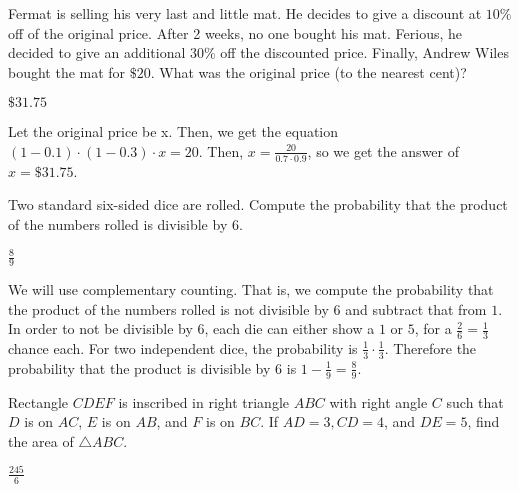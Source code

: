\documentclass[11pt]{article}
\begin{document}
\begin{problem} %
Fermat is selling his very last and little mat. He decides to give a discount at $10\%$ off of the original price. After 2 weeks, no one bought his mat. Ferious, he decided to give an additional $30\%$ off the discounted price. Finally, Andrew Wiles bought the mat for $\$20$. What was the original price (to the nearest cent)?
\end{problem}

\begin{answer}
$\$31.75$
\end{answer}

\begin{solution}
Let the original price be x. Then, we get the equation $(1-0.1) \cdot (1-0.3) \cdot x = 20$. Then, $x = \frac{20}{0.7 \cdot 0.9}$, so we get the answer of $x = \$31.75$.
\end{solution}


\begin{problem}
Two standard six-sided dice are rolled. Compute the probability that the product of the numbers rolled is divisible by $6$.
\end{problem}

\begin{answer} %
$\boxed{\frac{8}{9}}$
\end{answer}

\begin{solution}
We will use complementary counting. That is, we compute the probability that the product of the numbers rolled is not divisible by $6$ and subtract that from $1$. In order to not be divisible by $6$, each die can either show a $1$ or $5$, for a $\frac{2}{6} = \frac{1}{3}$ chance each. For two independent dice, the probability is $\frac{1}{3} \cdot \frac{1}{3}$. Therefore the probability that the product is divisible by $6$ is $1 - \frac{1}{9} = \boxed{\frac{8}{9}}$.
\end{solution}


\begin{problem}%
Rectangle $CDEF$ is inscribed in right triangle $ABC$ with right angle $C$ such that $D$ is on $AC$, $E$ is on $AB$, and $F$ is on $BC$. If $AD=3, CD=4$, and $DE=5$, find the area of $\triangle ABC$.
\end{problem}

\begin{answer}
$\boxed{\frac{245}{6}}$
\end{answer}
\end{document}
